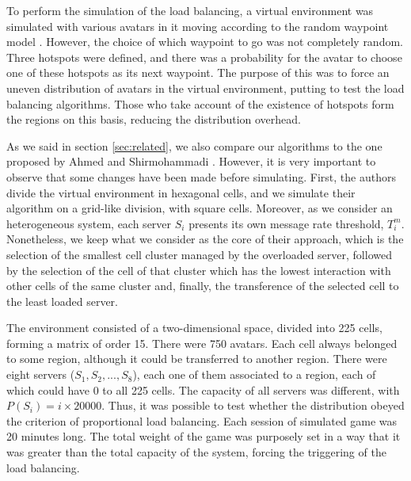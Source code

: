 To perform the simulation of the load balancing, a virtual environment was simulated with various avatars in it moving according to the random waypoint model \cite{bettstetter2004spr}. However, the choice of which waypoint to go was not completely random. Three hotspots were defined, and there was a probability for the avatar to choose one of these hotspots as its next waypoint. The purpose of this was to force an uneven distribution of avatars in the virtual environment, putting to test the load balancing algorithms. Those who take account of the existence of hotspots form the regions on this basis, reducing the distribution overhead.

As we said in section \ref{sec:related}, we also compare our algorithms to the one proposed by Ahmed and Shirmohammadi \cite{ahmed2008mol}. However, it is very important to observe that some changes have been made before simulating. First, the authors divide the virtual environment in hexagonal cells, and we simulate their algorithm on a grid-like division, with square cells. Moreover, as we consider an heterogeneous system, each server $S_i$ presents its own message rate threshold, $T_i^m$.
%
Nonetheless, we keep what we consider as the core of their approach, which is the selection of the smallest cell cluster managed by the overloaded server, followed by the selection of the cell of that cluster which has the lowest interaction with other cells of the same cluster and, finally, the transference of the selected cell to the least loaded server.

The environment consisted of a two-dimensional space, divided into 225 cells, forming a matrix of order 15. There were 750 avatars. Each cell always belonged to some region, although it could be transferred to another region. There were eight servers ($S_1, S_2, ..., S_8$), each one of them associated to a region, each of which could have 0 to all 225 cells. The capacity of all servers was different, with $P(S_i) = i \times 20000$. Thus, it was possible to test whether the distribution obeyed the criterion of proportional load balancing. Each session of simulated game was 20 minutes long. The total weight of the game was purposely set in a way that it was greater than the total capacity of the system, forcing the triggering of the load balancing.


